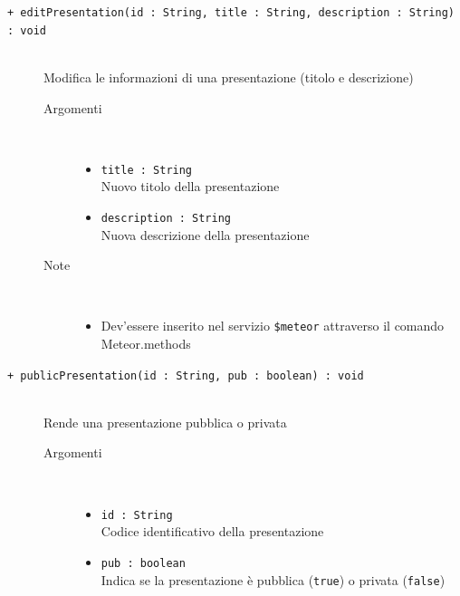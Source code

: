 \begin{description}
	\begin{description}
		\item[\texttt{+ editPresentation(id : String, title : String, description : String) : void			}] \hfill \\
			Modifica le informazioni di una presentazione (titolo e descrizione)
			
		\begin{description}
			\item[Argomenti] \hfill \\
				\begin{itemize}
				
					\item \texttt{title : String			} \hfill \\
					Nuovo titolo della presentazione
					\item \texttt{description : String			} \hfill \\
					Nuova descrizione della presentazione
					
				\end{itemize}
			\item[Note] \hfill \\
			\begin{itemize}
					\item Dev'essere inserito nel servizio \texttt{\$meteor} attraverso il comando Meteor.methods
				\end{itemize}
		\end{description}
	\end{description}

	\begin{description}
		\item[\texttt{+ publicPresentation(id : String, pub : boolean) : void			}] \hfill \\
			Rende una presentazione pubblica o privata
			
		\begin{description}
			\item[Argomenti] \hfill \\
				\begin{itemize}
				
					\item \texttt{id :  String			} \hfill \\
					Codice identificativo della presentazione
					\item \texttt{pub :  boolean			} \hfill \\
					Indica se la presentazione è pubblica (\texttt{true}) o privata (\texttt{false})
					

\end{itemize}
\end{description}
\end{description}
\end{description}
